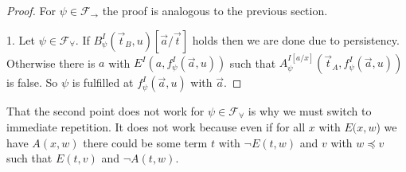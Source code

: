 \documentclass[a4paper,UKenglish,cleveref, autoref, thm-restate]{lipics-v2021}
\begin{document}
\begin{proof}
	For $\psi\in\mathcal F_\to$ the proof is analogous to the previous section.
	
	1. Let $\psi\in\mathcal F_\forall$. If $B^I_\psi(\vec t_B, u)[\vec a/\vec t]$ holds then we are done due to persistency. Otherwise there is $a$ with $E^I(a, f^I_\psi(\vec a, u))$ such that $A^{I[a/x]}_\psi(\vec t_A, f^I_\psi(\vec a, u))$ is false. So $\psi$ is fulfilled at $f^I_\psi(\vec a, u)$ with $\vec a$.
\end{proof}

That the second point does not work for $\psi\in\mathcal F_\forall$ is why we must switch to immediate repetition. It does not work because even if for all $x$ with $E(x, w$) we have $A(x, w)$  there could be some term $t$ with $\neg E(t, w)$ and $v$ with $w\preceq v$ such that $E(t, v)$ and $\neg A(t, w)$.
\end{document}
